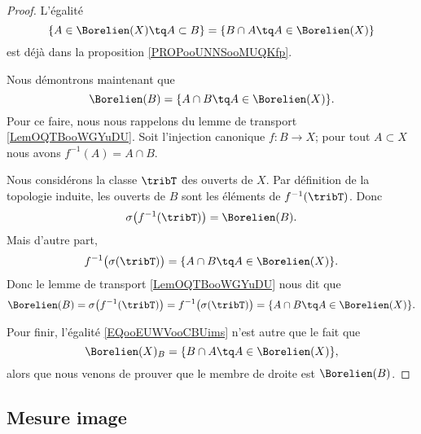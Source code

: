 \begin{proof}
    L'égalité
    \begin{equation}
        \{ A\in \Borelien(X)\tq A\subset B \}=\{ B\cap A\tq A\in \Borelien(X) \}
    \end{equation}
    est déjà dans la proposition \ref{PROPooUNNSooMUQKfp}.

    Nous démontrons maintenant que
    \begin{equation}
        \Borelien(B)=\{ A\cap B\tq A\in\Borelien(X) \}.
    \end{equation}
    Pour ce faire, nous nous rappelons du lemme de transport \ref{LemOQTBooWGYuDU}. Soit l'injection canonique \( f\colon B\to X\); pour tout \( A\subset X\) nous avons \( f^{-1}(A)=A\cap B\). 
    
    Nous considérons la classe \( \tribT\) des ouverts de \( X\). Par définition de la topologie induite, les ouverts de \( B\) sont les éléments de \( f^{-1}(\tribT)\). Donc
    \begin{equation}
        \sigma\big( f^{-1}(\tribT) \big)=\Borelien(B).
    \end{equation}
    Mais d'autre part,
    \begin{equation}
        f^{-1}\big( \sigma(\tribT) \big)=\{ A\cap B\tq A\in \Borelien(X) \}.
    \end{equation}
    Donc le lemme de transport \ref{LemOQTBooWGYuDU} nous dit que
    \begin{equation}
        \Borelien(B)=\sigma\big( f^{-1}(\tribT) \big)= f^{-1}\big( \sigma(\tribT) \big)=\{ A\cap B\tq A\in \Borelien(X) \}.
    \end{equation}

    Pour finir, l'égalité \eqref{EQooEUWVooCBUims} n'est autre que le fait que
    \begin{equation}
        \Borelien(X)_B=\{ B\cap A\tq A\in \Borelien(X) \},
    \end{equation}
    alors que nous venons de prouver que le membre de droite est \( \Borelien(B)\).
\end{proof}

\subsection{Mesure image}

